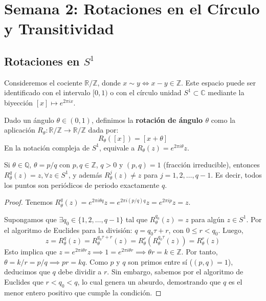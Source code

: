 
\chapter{Semana 2: Rotaciones en el Círculo y Transitividad}

\section{Rotaciones en $S^1$}

Consideremos el cociente $\mathbb{R}/\mathbb{Z}$, donde $x \sim y \iff x - y \in \mathbb{Z}$. Este espacio puede ser identificado con el intervalo $[0,1)$ o con el círculo unidad $S^1 \subset \mathbb{C}$ mediante la biyección $[x] \mapsto e^{2\pi i x}$.

\begin{definicion}
	Dado un ángulo $\theta \in (0,1)$, definimos la \textbf{rotación de ángulo $\theta$} como la aplicación $R_\theta: \mathbb{R}/\mathbb{Z} \to \mathbb{R}/\mathbb{Z}$ dada por:
	$$R_\theta([x]) = [x + \theta]$$
	En la notación compleja de $S^1$, equivale a $R_\theta(z) = e^{2\pi i \theta} z$.
\end{definicion}

\begin{proposicion}
	Si $\theta \in \mathbb{Q}$, $\theta = p/q$ con $p, q \in \mathbb{Z}$, $q > 0$ y $(p,q)=1$ (fracción irreducible), entonces $R_\theta^q(z) = z, \forall z \in S^1$, y además $R_\theta^j(z) \neq z$ para $j=1,2,\dots,q-1$. Es decir, todos los puntos son periódicos de periodo exactamente $q$.
\end{proposicion}
\begin{proof}
	Tenemos $R_\theta^q(z) = e^{2\pi i \theta q} z = e^{2\pi i (p/q) q} z = e^{2\pi i p} z = z$.
	
	Supongamos que $\exists q_0 \in \{1,2,\dots,q-1\}$ tal que $R_\theta^{q_0}(z) = z$ para algún $z \in S^1$. Por el algoritmo de Euclides para la división: $q = q_0 \tau + r$, con $0 \le r < q_0$. 
	Luego, 
	$$z = R_\theta^q(z) = R_\theta^{q_0 \tau + r}(z) = R_\theta^r(R_\theta^{q_0 \tau}(z)) = R_\theta^r(z)$$
	Esto implica que $z = e^{2\pi i \theta r} z \implies 1 = e^{2\pi i \theta r} \implies \theta r = k \in \mathbb{Z}$. 
	Por tanto, $\theta = k/r = p/q \implies p r = k q$. Como $p$ y $q$ son primos entre sí ($(p,q)=1$), deducimos que $q$ debe dividir a $r$. Sin embargo, sabemos por el algoritmo de Euclides que $r < q_0 < q$, lo cual genera un absurdo, demostrando que $q$ es el menor entero positivo que cumple la condición.
\end{proof}

